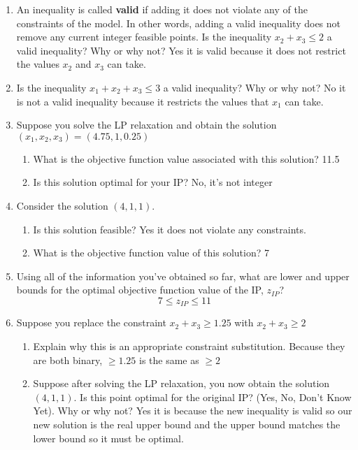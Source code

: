 \documentclass[11pt]{article}
\theoremstyle{definition}
\newcommand{\blu}{\color{blue}}
\begin{document}
\begin{enumerate}
\begin{enumerate}
\item An inequality is called \textbf{valid} if adding it does not violate any of the constraints of the model. In other words, adding a valid inequality does not remove any current integer feasible points. Is the inequality $x_2 + x_3 \leq 2$ a valid inequality? Why or why not?
{\blu
Yes it is valid because it does not restrict the values $x_2$ and $x_3$ can take.
}
\item Is the inequality $x_1 + x_2 + x_3 \leq 3$ a valid inequality? Why or why not?
{
No it is not a valid inequality because it restricts the values that $x_1$ can take.
}
\item Suppose you solve the LP relaxation and obtain the solution $(x_1, x_2, x_3) = (4.75, 1, 0.25)$
	\begin{enumerate}
	\item What is the objective function value associated with this solution?
	{\blu
	11.5
	}
	\item Is this solution optimal for your IP?
	{\blu
	No, it's not integer
	}
	\end{enumerate}
\item Consider the solution $(4,1,1)$.
	\begin{enumerate}
	\item Is this solution feasible?
	{\blu
	Yes it does not violate any constraints.
	}
	\item What is the objective function value of this solution?
	{\blu
	7
	}
	\end{enumerate}
\item Using all of the information you've obtained so far, what are lower and upper bounds for the optimal objective function value of the IP, $z_{IP}$?
{\blu
\[
7 \leq z_{IP} \leq 11
\]
}
\item Suppose you replace the constraint $x_2 + x_3 \geq 1.25$ with $x_2 + x_3 \geq 2$
	\begin{enumerate}
	\item Explain why this is an appropriate constraint substitution.
	{
	\blu
	Because they are both binary, $\geq 1.25$ is the same as $\geq 2$
	}
	\item Suppose after solving the LP relaxation, you now obtain the solution $(4,1,1)$. Is this point optimal for the original IP? (Yes, No, Don't Know Yet). Why or why not?
	{
	\blu Yes it is because the new inequality is valid so our new solution is the real upper bound and the upper bound matches the lower bound so it must be optimal.
	}
	\end{enumerate}
\end{enumerate}


\end{enumerate}
\end{document}
